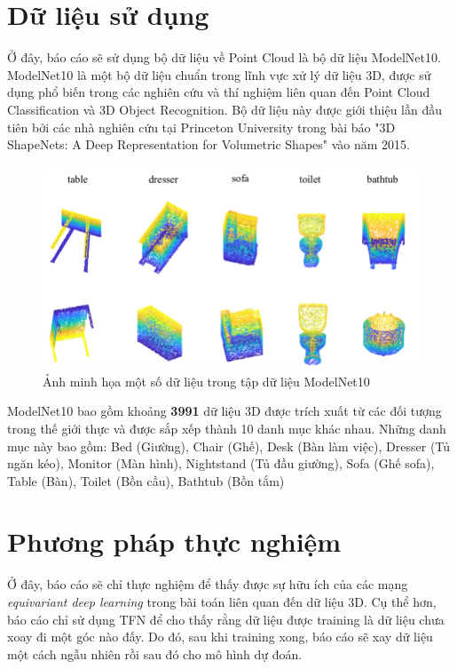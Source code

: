 \section{Dữ liệu sử dụng}
Ở đây, báo cáo sẽ sử dụng bộ dữ liệu về Point Cloud là bộ dữ liệu ModelNet10\cite{data_modelnet10}. ModelNet10 là một bộ dữ liệu chuẩn trong lĩnh vực xử lý dữ liệu 3D, được sử dụng phổ biến trong các nghiên cứu và thí nghiệm liên quan đến Point Cloud Classification và 3D Object Recognition. Bộ dữ liệu này được giới thiệu lần đầu tiên bởi các nhà nghiên cứu tại Princeton University trong bài báo "3D ShapeNets: A Deep Representation for Volumetric Shapes"\cite{data_modelnet10} vào năm 2015.

\begin{figure}[H]
    \centering
    \includegraphics[width=0.8\linewidth]{Images/TFN/data_img.png}
    \caption{Ảnh minh họa một số dữ liệu trong tập dữ liệu ModelNet10}
\end{figure}

ModelNet10 bao gồm khoảng \textbf{3991} dữ liệu 3D được trích xuất từ các đối tượng trong thế giới thực và được sắp xếp thành 10 danh mục khác nhau. Những danh mục này bao gồm: Bed (Giường), Chair (Ghế), Desk (Bàn làm việc), Dresser (Tủ ngăn kéo), Monitor (Màn hình), Nightstand (Tủ đầu giường), Sofa (Ghế sofa), Table (Bàn), Toilet (Bồn cầu), Bathtub (Bồn tắm)

\section{Phương pháp thực nghiệm}
Ở đây, báo cáo sẽ chỉ thực nghiệm để thấy được sự hữu ích của các mạng \textit{equivariant deep learning} trong bài toán liên quan đến dữ liệu 3D. Cụ thể hơn, báo cáo chỉ sử dụng TFN để cho thấy rằng dữ liệu được training là dữ liệu chưa xoay đi một góc nào đấy. Do đó, sau khi training xong, báo cáo sẽ xay dữ liệu một cách ngẫu nhiên rồi sau đó cho mô hình dự đoán.


